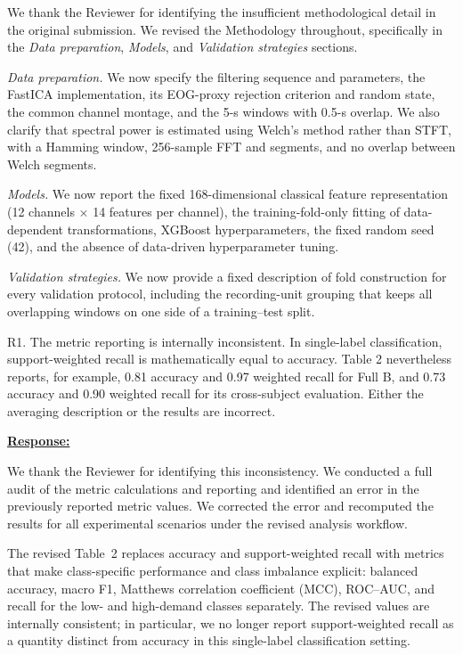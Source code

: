\documentclass{article}
\begin{document}
We thank the Reviewer for identifying the insufficient methodological detail in
the original submission. We revised the Methodology throughout, specifically in
the \emph{Data preparation}, \emph{Models}, and \emph{Validation strategies}
sections.

\emph{Data preparation.} We now specify the filtering sequence and parameters,
the FastICA implementation, its EOG-proxy rejection criterion and random state,
the common channel montage, and the 5-s windows with 0.5-s overlap. We also
clarify that spectral power is estimated using Welch's method rather than STFT,
with a Hamming window, 256-sample FFT and segments, and no overlap between
Welch segments.

\emph{Models.} We now report the fixed 168-dimensional classical feature
representation (12 channels $\times$ 14 features per channel), the
training-fold-only fitting of data-dependent
transformations, XGBoost hyperparameters, the fixed random seed (42), and the absence of
data-driven hyperparameter tuning.

\emph{Validation strategies.} We now provide a fixed description of fold
construction for every validation protocol, including the recording-unit
grouping that keeps all overlapping windows on one side of a training--test
split.

\vspace{0.3cm}


\begin{cmt}{}{}

R1. The metric reporting is internally inconsistent. In single-label
classification, support-weighted recall is mathematically equal to accuracy.
Table 2 nevertheless reports, for example, 0.81 accuracy and 0.97 weighted
recall for Full B, and 0.73 accuracy and 0.90 weighted recall for its
cross-subject evaluation. Either the averaging description or the results are
incorrect.

\end{cmt}
\vspace{0.1cm}
\noindent
\underline{\textbf{Response:}}
\vspace{0.2cm}

We thank the Reviewer for identifying this inconsistency. We conducted a full
audit of the metric calculations and reporting and identified an error in the
previously reported metric values. We corrected the error and recomputed the
results for all experimental scenarios under the revised analysis workflow.

The revised Table~2 replaces accuracy and support-weighted recall with metrics
that make class-specific performance and class imbalance explicit: balanced
accuracy, macro F1, Matthews correlation coefficient (MCC), ROC--AUC, and
recall for the low- and high-demand classes separately. The revised values are
internally consistent; in particular, we no longer report support-weighted
recall as a quantity distinct from accuracy in this single-label classification
setting.
\end{document}
